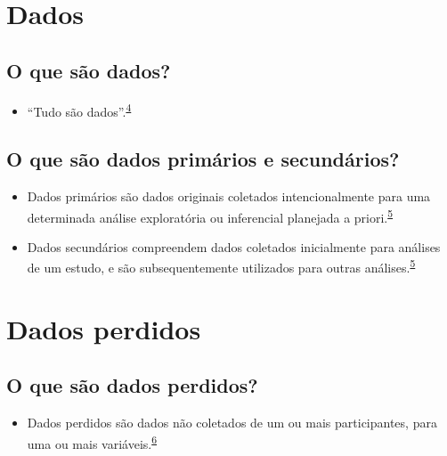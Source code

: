 \documentclass[
]{book}
\providecommand{\tightlist}{%
  \setlength{\itemsep}{0pt}\setlength{\parskip}{0pt}}
\begin{document}
\hypertarget{dados-1}{%
\section{Dados}\label{dados-1}}

\hypertarget{o-que-suxe3o-dados}{%
\subsection{O que são dados?}\label{o-que-suxe3o-dados}}

\begin{itemize}
\tightlist
\item
  ``Tudo são dados''.\textsuperscript{\protect\hyperlink{ref-Olson2021}{4}}
\end{itemize}

\hypertarget{o-que-suxe3o-dados-primuxe1rios-e-secunduxe1rios}{%
\subsection{O que são dados primários e secundários?}\label{o-que-suxe3o-dados-primuxe1rios-e-secunduxe1rios}}

\begin{itemize}
\item
  Dados primários são dados originais coletados intencionalmente para uma determinada análise exploratória ou inferencial planejada a priori.\textsuperscript{\protect\hyperlink{ref-vetter2017}{5}}
\item
  Dados secundários compreendem dados coletados inicialmente para análises de um estudo, e são subsequentemente utilizados para outras análises.\textsuperscript{\protect\hyperlink{ref-vetter2017}{5}}
\end{itemize}

\hypertarget{dados-perdidos}{%
\section{Dados perdidos}\label{dados-perdidos}}

\hypertarget{o-que-suxe3o-dados-perdidos}{%
\subsection{O que são dados perdidos?}\label{o-que-suxe3o-dados-perdidos}}

\begin{itemize}
\tightlist
\item
  Dados perdidos são dados não coletados de um ou mais participantes, para uma ou mais variáveis.\textsuperscript{\protect\hyperlink{ref-Altman2007}{6}}
\end{itemize}
\end{document}
